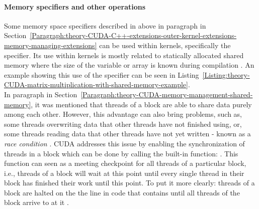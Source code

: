 \paragraph{Memory specifiers and other operations}
Some memory space specifiers described in above in paragraph \textit{} in Section~\ref{Paragraph:theory-CUDA-C++-extensions-outer-kernel-extensions-memory-managing-extensions} can be used within kernels, specifically the  specifier. Its use within kernels is mostly related to statically allocated shared memory where the size of the variable or array is known during compilation \cite{NVIDIAMay2022}. An example showing this use of the specifier can be seen in Listing~\ref{Listing:theory-CUDA-matrix-multiplication-with-shared-memory-example}. \\
In paragraph \textit{} in Section~\ref{Paragraph:theory-CUDA-memory-management-shared-memory}, it was mentioned that threads of a block are able to share data purely among each other. However, this advantage can also bring problems, such as, some threads overwriting data that other threads have not finished using, or, some threads reading data that other threads have not yet written - known as a \textit{race condition} \cite{Harris28January2013}. CUDA addresses this issue by enabling the synchronization of threads in a block which can be done by calling the built-in function: . This function can seen as a meeting checkpoint for all threads of a particular block, i.e., threads of a block will wait at this point until every single thread in their block has finished their work until this point. To put it more clearly: threads of a block are halted on the the line in code that contains  until all threads of the block arrive to at it \cite{NVIDIAMay2022}.


